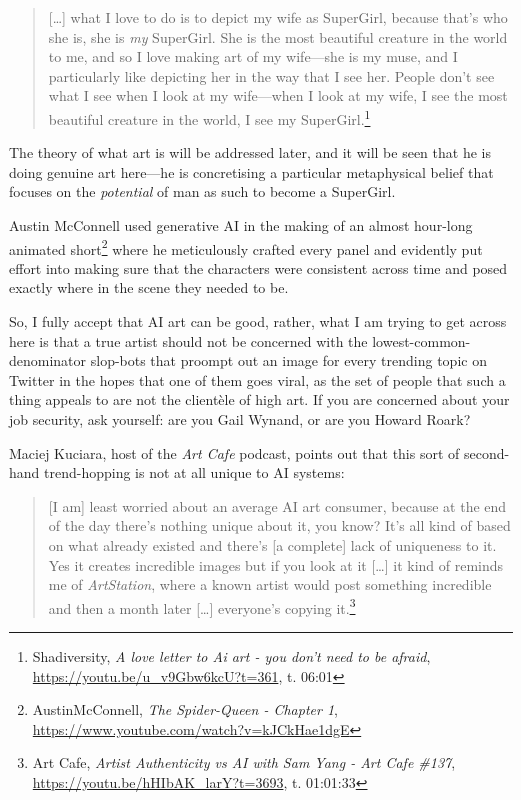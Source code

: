 \documentclass[11pt]{article}
\begin{document}
\begin{quote}
[\ldots{}] what I love to do is to depict my wife as SuperGirl, because that's who she is, she is \emph{my} SuperGirl. She is the most beautiful creature in the world to me, and so I love making art of my wife---she is my muse, and I particularly like depicting her in the way that I see her. People don't see what I see when I look at my wife---when I look at my wife, I see the most beautiful creature in the world, I see my SuperGirl.\footnote{Shadiversity, \emph{A love letter to Ai art - you don't need to be afraid}, \url{https://youtu.be/u\_v9Gbw6kcU?t=361}, t. 06:01}
\end{quote}

The theory of what art is will be addressed later, and it will be seen that he is doing genuine art here---he is concretising a particular metaphysical belief that focuses on the \emph{potential} of man as such to become a SuperGirl.

Austin McConnell used generative AI in the making of an almost hour-long animated short\footnote{AustinMcConnell, \emph{The Spider-Queen - Chapter 1}, \url{https://www.youtube.com/watch?v=kJCkHae1dgE}} where he meticulously crafted every panel and evidently put effort into making sure that the characters were consistent across time and posed exactly where in the scene they needed to be.

So, I fully accept that AI art can be good, rather, what I am trying to get across here is that a true artist should not be concerned with the lowest-common-denominator slop-bots that proompt out an image for every trending topic on Twitter in the hopes that one of them goes viral, as the set of people that such a thing appeals to are not the clientèle of high art. If you are concerned about your job security, ask yourself: are you Gail Wynand, or are you Howard Roark?

Maciej Kuciara, host of the \emph{Art Cafe} podcast, points out that this sort of second-hand trend-hopping is not at all unique to AI systems:
\begin{quote}
[I am] least worried about an average AI art consumer, because at the end of the day there's nothing unique about it, you know? It's all kind of based on what already existed and there's [a complete] lack of uniqueness to it. Yes it creates incredible images but if you look at it [\ldots{}] it kind of reminds me of \emph{ArtStation}, where a known artist would post something incredible and then a month later [\ldots{}] everyone's copying it.\footnote{Art Cafe, \emph{Artist Authenticity vs AI with Sam Yang - Art Cafe \#137}, \url{https://youtu.be/hHIbAK\_larY?t=3693}, t. 01:01:33}
\end{quote}
\end{document}
